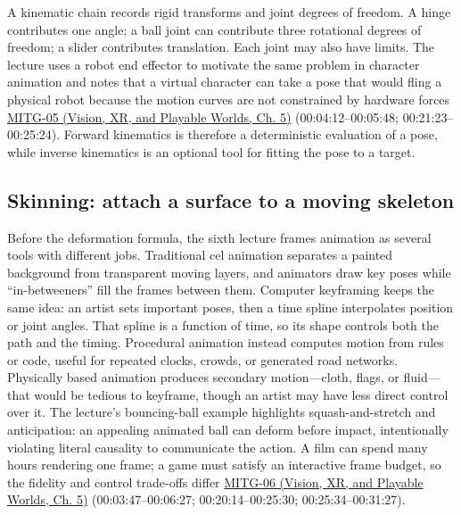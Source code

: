 A kinematic chain records rigid transforms and joint degrees of freedom. A hinge contributes one angle; a ball joint can contribute three rotational degrees of freedom; a slider contributes translation. Each joint may also have limits. The lecture uses a robot end effector to motivate the same problem in character animation and notes that a virtual character can take a pose that would fling a physical robot because the motion curves are not constrained by hardware forces \href{../07-Vision-XR-and-Playable-Worlds/main.pdf\#nameddest=04-visual-computing-ii-ch036-mitg-05---hierarchical-modeling}{MITG-05 (Vision, XR, and Playable Worlds, Ch. 5)} (00:04:12--00:05:48; 00:21:23--00:25:24). Forward kinematics is therefore a deterministic evaluation of a pose, while inverse kinematics is an optional tool for fitting the pose to a target.

\subsection{Skinning: attach a surface to a moving skeleton}\label{04-visual-computing-ii-ch029-skinning-attach-a-surface-to-a-moving-skeleton}

\hypertarget{04-visual-computing-ii-ch029-skinning-attach-a-surface-to-a-moving-skeleton}{}

Before the deformation formula, the sixth lecture frames animation as several tools with different jobs. Traditional cel animation separates a painted background from transparent moving layers, and animators draw key poses while ``in-betweeners'' fill the frames between them. Computer keyframing keeps the same idea: an artist sets important poses, then a time spline interpolates position or joint angles. That spline is a function of time, so its shape controls both the path and the timing. Procedural animation instead computes motion from rules or code, useful for repeated clocks, crowds, or generated road networks. Physically based animation produces secondary motion---cloth, flags, or fluid---that would be tedious to keyframe, though an artist may have less direct control over it. The lecture's bouncing-ball example highlights squash-and-stretch and anticipation: an appealing animated ball can deform before impact, intentionally violating literal causality to communicate the action. A film can spend many hours rendering one frame; a game must satisfy an interactive frame budget, so the fidelity and control trade-offs differ \href{../07-Vision-XR-and-Playable-Worlds/main.pdf\#nameddest=04-visual-computing-ii-ch036-mitg-06---animation-skinningenveloping}{MITG-06 (Vision, XR, and Playable Worlds, Ch. 5)} (00:03:47--00:06:27; 00:20:14--00:25:30; 00:25:34--00:31:27).

